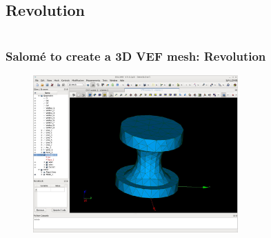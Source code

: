 \documentclass[10pt, hyperref={unicode=true,pdfusetitle, bookmarks=true,bookmarksnumbered=false,bookmarksopen=false, breaklinks=false,pdfborder={0 0 1},backref=true,colorlinks=true,linkcolor=darkblue,pageanchor}]{beamer}
\begin{document}
\subsection{Revolution}
\begin{frame}
\begin{small}
\begin{columns}[c] 
\tableofcontents[sections={1-9},currentsection, currentsubsection]
\tableofcontents[sections={10-16},currentsection, currentsubsection]
\end{columns}
\end{small}
\end{frame}
\begin{frame}
\frametitle{Salom\'e to create a 3D VEF mesh: Revolution}

\begin{figure}
\includegraphics[width=0.7\textwidth]{PICTURES/salome9.jpg}
\end{figure}

\end{frame}
\end{document}
